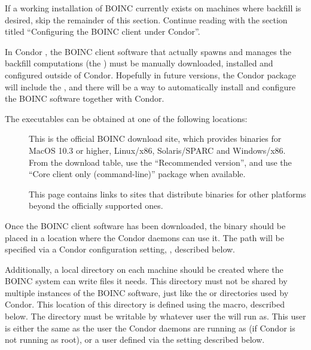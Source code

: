 
If a working installation of BOINC currently exists on machines
where backfill is desired,
skip the remainder of this section.
Continue reading with the section titled ``Configuring the BOINC
client under Condor''.

In Condor \VersionNotice, the BOINC client software that actually
spawns and manages the backfill computations (the
) must be manually downloaded, installed and
configured outside of Condor.
Hopefully in future versions, the Condor package will include the
, and there will be a way to automatically install
and configure the BOINC software together with Condor.

The  executables can be obtained at one of the
following locations:
\begin{description}
\item[]
  This is the official BOINC download site, which provides binaries
  for MacOS 10.3 or higher, Linux/x86, Solaris/SPARC and Windows/x86.
  From the download table, use the ``Recommended version'', and use 
  the ``Core client only (command-line)'' package when available.

\item[]
  This page contains links to sites that distribute
   binaries for other platforms beyond the
  officially supported ones.
\end{description}

Once the BOINC client software has been downloaded, the
 binary should be placed in a location where the
Condor daemons can use it.
The path will be specified via a Condor configuration setting,
, described below.

Additionally, a local directory on each machine should be created
where the BOINC system can write files it needs.
This directory must not be shared by multiple instances of the BOINC
software, just like the  or  directories
used by Condor.
This location of this directory is defined using the
 macro, described below.
The directory must be writable by whatever user the
 will run as.
This user is either the same as the user the Condor daemons are
running as (if Condor is not running as root), or a user defined via
the  setting described below.

